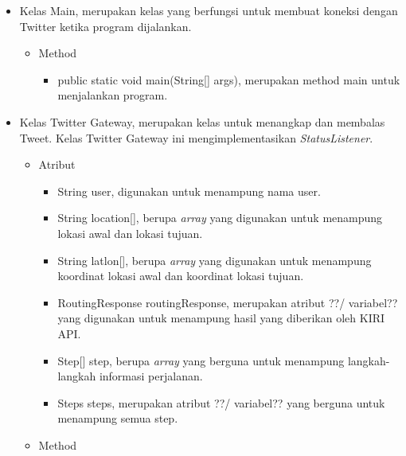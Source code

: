 \begin{itemize}
		\item Kelas Main, merupakan kelas yang berfungsi untuk membuat koneksi dengan Twitter ketika program dijalankan.
		
				\begin{itemize}
							\item Method
							
									\begin{itemize}
												\item public static void main(String[] args), merupakan method main untuk menjalankan program.
										
									\end{itemize}
				\end{itemize}
		
		\item Kelas Twitter Gateway, merupakan kelas untuk menangkap dan membalas Tweet. Kelas Twitter Gateway ini mengimplementasikan \textit{StatusListener}.
		
		
				\begin{itemize}
							\item Atribut
							
							
									\begin{itemize}
												\item String user, digunakan untuk menampung nama user.
												\item String location[], berupa \textit{array} yang digunakan untuk menampung lokasi awal dan lokasi tujuan.
												\item String latlon[], berupa \textit{array} yang digunakan untuk menampung koordinat lokasi awal dan koordinat lokasi tujuan.
												\item RoutingResponse routingResponse, merupakan atribut ??/ variabel?? yang digunakan untuk menampung hasil yang diberikan oleh KIRI API.
												\item Step[] step, berupa \textit{array} yang berguna untuk menampung langkah-langkah informasi perjalanan.
												\item Steps steps, merupakan atribut ??/ variabel?? yang berguna untuk menampung semua step.
									\end{itemize}
							
							\item Method
							

\end{itemize}
\end{itemize}
